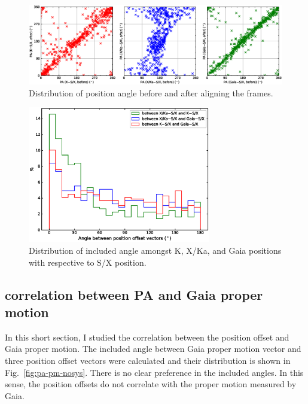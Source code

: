 \documentclass{aa}   %
\begin{document}
\begin{figure}[hbtp]
    \centering
    \includegraphics[width=160mm]{figs/pa-diff-from-sys}
    \caption[]{\label{fig:pa-diff-from-sys}
        Distribution of position angle before and after aligning the frames. 
    }
\end{figure}

\begin{figure}[hbtp]
    \centering
    \includegraphics[width=80mm]{figs/pa-diff-nosys}
    \caption[]{\label{fig:pa-diff-nosys}
        Distribution of included angle amongst K, X/Ka, and Gaia positions with respective to S/X position. 
    }
\end{figure}

\subsection{correlation between PA and Gaia proper motion} \label{subsec:pa-pm}

In this short section, I studied the correlation between the position offset and Gaia proper motion.
The included angle between Gaia proper motion vector and three position offset vectors were calculated and their distribution is shown in Fig.~\ref{fig:pa-pm-nosys}.
There is no clear preference in the included angles.
In this sense, the position offsets do not correlate with the proper motion measured by Gaia.
\end{document}
